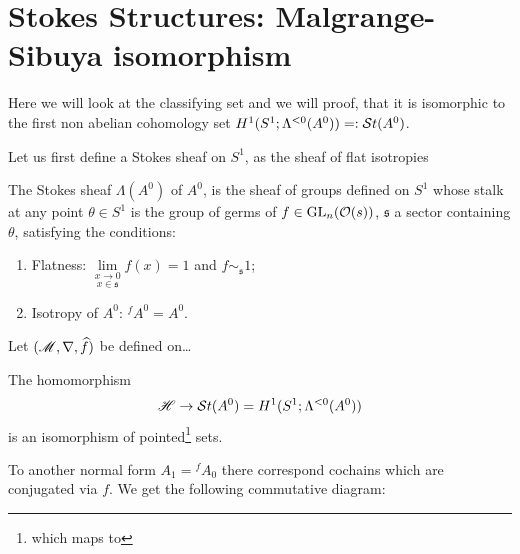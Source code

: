 \section{Stokes Structures: Malgrange-Sibuya isomorphism}
\begin{comment}
  \begin{itemize}
    \item \cite{Loday1994} Thm I.2.1
    \item \cite{Loday2014} Thm. 4.3.9, on p. 78
    \item \cite{sabbah2007isomonodromic} Thm II.6.2
  \end{itemize}
\end{comment}
Here we will look at the classifying set and we will proof, that it is
isomorphic \TODO[as\dots] to the first non abelian cohomology set
$H^1(S^1;\Lambda^{<0}(A^0))=:\mathcal{S}{}t(A^0)$.

Let us first define a Stokes sheaf on $S^1$, as the sheaf of flat
isotropies\TODO[\dots]
\begin{defn}
  The Stokes sheaf $\Lambda(A^0)$ of $A^0$, is the sheaf of groups defined on
  $S^1$ whose stalk at any point $\theta\in S^1$ is the group of germs of
  $f\in\operatorname{GL}_n(\mathcal{O}(s))$, $\mathfrak{s}$ a sector containing $\theta$, satisfying
  the conditions:
  \begin{enumerate}
    \item Flatness: $\underset{x\in\mathfrak{s}}{\underset{x\to0}{\lim}}f(x)=1$
      and $f\sim_{\mathfrak{s}} 1$;
    \item Isotropy of $A^0$: ${}^f\!A^0=A^0$.
  \end{enumerate}
\end{defn}

Let $(\mathscr{M},\nabla,\widehat f)$ be defined on\dots

\begin{thm}
  The homomorphism
  \[
    \mathscr{H}\to\mathcal{S}{}t(A^0)=H^1(S^1;\Lambda^{<0}(A^0))
  \]
  is an isomorphism of pointed\footnote{which maps \TODO{} to \TODO{}} sets.
\end{thm}
\begin{rem}
  To another normal form $A_1={}^f\!A_0$ there correspond cochains which are
  conjugated via $f$.
  We get the following commutative diagram:
  \TODO{}
\end{rem}



